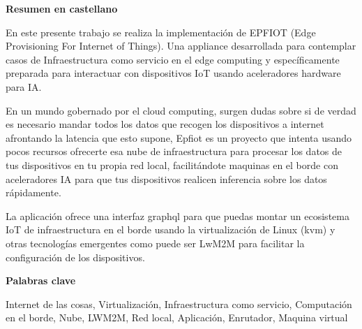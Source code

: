 
\newpage

\thispagestyle{empty}

\begin{center}

{\bf \Huge Resumen en castellano}

  \end{center}
\vspace{1cm}

En este presente trabajo se realiza la implementación de EPFIOT (Edge Provisioning For Internet of Things). Una appliance desarrollada para contemplar casos de Infraestructura como servicio en el edge computing y específicamente preparada para interactuar con dispositivos IoT usando aceleradores hardware para IA.

En un mundo gobernado por el cloud computing, surgen dudas sobre si de verdad es necesario mandar todos los datos que recogen los dispositivos a internet afrontando la latencia que esto supone, Epfiot es un proyecto que intenta usando pocos recursos ofrecerte esa nube de infraestructura para procesar los datos de tus dispositivos en tu propia red local, facilitándote maquinas en el borde con aceleradores IA para que tus dispositivos realicen inferencia sobre los datos rápidamente.

La aplicación ofrece una interfaz graphql para que puedas montar un ecosistema IoT de infraestructura en el borde usando la virtualización de Linux (kvm) y otras tecnologías emergentes como puede ser LwM2M para facilitar la configuración de los dispositivos.

\vspace{1cm}


\begin{center}

{\bf \Large Palabras clave}

   \end{center}

   \vspace{0.5cm}
   
   Internet de las cosas, Virtualización, Infraestructura como servicio, Computación en el borde, Nube, LWM2M, Red local, Aplicación, Enrutador, Maquina virtual
   


